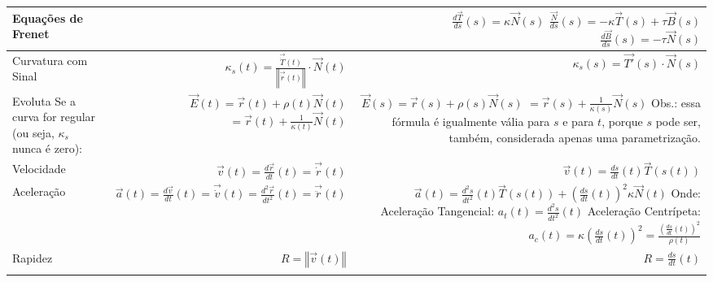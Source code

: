 \documentclass{article}
\newcommand\N[1]{\left\Vert#1\right\Vert}
\begin{document}
\begin{center}
\begin{tabular}{ l | r | r  }
			\hline
			Equações de Frenet & {} & \makecell[r]{ $ \frac{d\vec{T}}{ds}(s) = \kappa \vec{N}(s) $ \\ $ \frac{\vec{N}}{ds}(s) = - \kappa\vec{T}(s) + \tau\vec{B}(s) $ \\ $ \frac{d\vec{B}}{ds}(s) = - \tau \vec{N}(s) $} \\  
			\hline
			Curvatura com Sinal & $ \kappa_s(t) = \frac{\vec{\dot T}(t)}{\N{\vec{\dot r}(t)}} \cdot \vec{N}(t) $ & $ \kappa_s(s) = \vec{T'}(s) \cdot \vec{N}(s) $\\  
			\hline
			\makecell[l]{Evoluta \\ Se a curva for regular \\ (ou seja, $\kappa_s$ nunca é zero):} & \makecell[r]{ \\ $ \vec{E}(t) = \vec{r}(t) + \rho (t)\vec{N}(t) $ \\ $ = \vec{r}(t) + \frac{1}{\kappa(t)}\vec{N}(t)$} & \makecell[r]{$ \vec{E}(s) = \vec{r}(s) + \rho (s)\vec{N}(s) $ \\ $ = \vec{r}(s) + \frac{1}{\kappa(s)}\vec{N}(s)$ \\ Obs.: essa fórmula é \\ igualmente vália para $s$ e \\ para $t$, porque $s$ pode ser, \\ também, considerada apenas \\ uma parametrização.} \\  
				\hline
			Velocidade & 
			$ \vec{v}(t) = \frac{d\vec{r}}{dt}(t) = \vec{\dot r}(t) $
			& $ \vec{v}(t) = \frac{ds}{dt}(t)\vec{T}(s(t)) $ \\
			\hline
			Aceleração & 
			$ \vec{a}(t) = \frac{d\vec{v}}{dt}(t) = \vec{\dot v}(t) = \frac{d^2\vec{r}}{dt^2}(t) = \vec{\ddot r}(t)$
			& \makecell[r]{$ \vec{a}(t) = \frac{d^2s}{dt^2}(t)\vec{T}(s(t)) + \left(\frac{ds}{dt}(t)\right)^2\kappa\vec{N}(t)$ \\ Onde: \\
			Aceleração Tangencial: \\ $a_t(t) = \frac{d^2s}{dt^2}(t)$ \\
			Aceleração Centrípeta: \\ $a_c(t) = \kappa\left(\frac{ds}{dt}(t)\right)^2 = \frac{\left(\frac{ds}{dt}(t)\right)^2}{\rho(t)}  $ } \\
			\hline
			Rapidez & 
			$R = \N{\vec{v}(t)}$ 
			& $R = \frac{ds}{dt}(t)$  \\ 
			\hhline{===}
		\end{tabular}
	\end{center}
\end{document}
